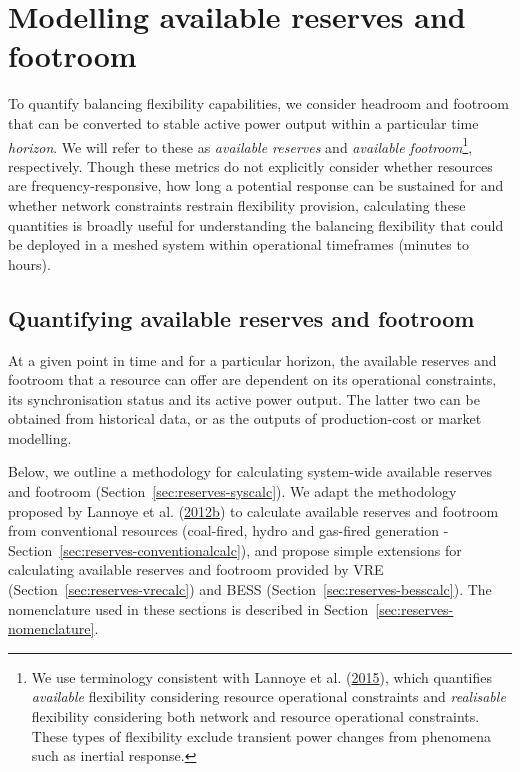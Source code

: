 \documentclass[12pt,a4paper,]{report}
\begin{document}
\hypertarget{sec:reserves-modeloverview}{%
\section{Modelling available reserves and
footroom}\label{sec:reserves-modeloverview}}

To quantify balancing flexibility capabilities, we consider headroom and
footroom that can be converted to stable active power output within a
particular time \emph{horizon}. We will refer to these as
\emph{available reserves} and \emph{available footroom}\footnote{We use
  terminology consistent with Lannoye et al.
  (\protect\hyperlink{ref-lannoyeTransmissionVariableGeneration2015}{2015}),
  which quantifies \emph{available} flexibility considering resource
  operational constraints and \emph{realisable} flexibility considering
  both network and resource operational constraints. These types of
  flexibility exclude transient power changes from phenomena such as
  inertial response.}, respectively. Though these metrics do not
explicitly consider whether resources are frequency-responsive, how long
a potential response can be sustained for and whether network
constraints restrain flexibility provision, calculating these quantities
is broadly useful for understanding the balancing flexibility that could
be deployed in a meshed system within operational timeframes (minutes to
hours).

\hypertarget{quantifying-available-reserves-and-footroom}{%
\subsection{Quantifying available reserves and
footroom}\label{quantifying-available-reserves-and-footroom}}

At a given point in time and for a particular horizon, the available
reserves and footroom that a resource can offer are dependent on its
operational constraints, its synchronisation status and its active power
output. The latter two can be obtained from historical data, or as the
outputs of production-cost or market modelling.

Below, we outline a methodology for calculating system-wide available
reserves and footroom (Section~\ref{sec:reserves-syscalc}). We adapt the
methodology proposed by Lannoye et al.
(\protect\hyperlink{ref-lannoyeEvaluationPowerSystem2012}{2012b}) to
calculate available reserves and footroom from conventional resources
(coal-fired, hydro and gas-fired generation -
Section~\ref{sec:reserves-conventionalcalc}), and propose simple
extensions for calculating available reserves and footroom provided by
VRE (Section~\ref{sec:reserves-vrecalc}) and BESS
(Section~\ref{sec:reserves-besscalc}). The nomenclature used in these
sections is described in Section~\ref{sec:reserves-nomenclature}.
\end{document}
